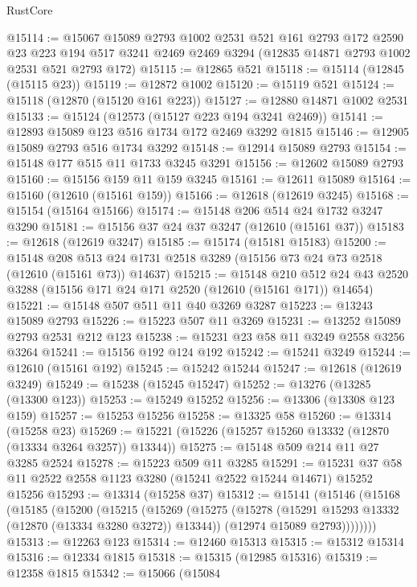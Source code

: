 \begin{lexlean}{RustCore}
\begin{coremodule}
@15114 := @15067
    @15089
    @2793
    @1002
    @2531
    @521
    @161
    @2793
    @172
    @2590
    @23
    @223
    @194
    @517
    @3241
    @2469
    @2469
    @3294
    (@12835 @14871 @2793 @1002 @2531 @521 @2793 @172)
@15115 := @12865 @521
@15118 := @15114 (@12845 (@15115 @23))
@15119 := @12872 @1002
@15120 := @15119 @521
@15124 := @15118 (@12870 (@15120 @161 @223))
@15127 := @12880 @14871 @1002 @2531
@15133 := @15124 (@12573 (@15127 @223 @194 @3241 @2469))
@15141 := @12893 @15089 @123 @516 @1734 @172 @2469 @3292 @1815
@15146 := @12905 @15089 @2793 @516 @1734 @3292
@15148 := @12914 @15089 @2793
@15154 := @15148 @177 @515 @11 @1733 @3245 @3291
@15156 := @12602 @15089 @2793
@15160 := @15156 @159 @11 @159 @3245
@15161 := @12611 @15089
@15164 := @15160 (@12610 (@15161 @159))
@15166 := @12618 (@12619 @3245)
@15168 := @15154 (@15164 @15166)
@15174 := @15148 @206 @514 @24 @1732 @3247 @3290
@15181 := @15156 @37 @24 @37 @3247 (@12610 (@15161 @37))
@15183 := @12618 (@12619 @3247)
@15185 := @15174 (@15181 @15183)
@15200 := @15148
    @208
    @513
    @24
    @1731
    @2518
    @3289
    (@15156 @73 @24 @73 @2518 (@12610 (@15161 @73)) @14637)
@15215 := @15148
    @210
    @512
    @24
    @43
    @2520
    @3288
    (@15156 @171 @24 @171 @2520 (@12610 (@15161 @171)) @14654)
@15221 := @15148 @507 @511 @11 @40 @3269 @3287
@15223 := @13243 @15089 @2793
@15226 := @15223 @507 @11 @3269
@15231 := @13252 @15089 @2793 @2531 @212 @123
@15238 := @15231 @23 @58 @11 @3249 @2558 @3256 @3264
@15241 := @15156 @192 @124 @192
@15242 := @15241 @3249
@15244 := @12610 (@15161 @192)
@15245 := @15242 @15244
@15247 := @12618 (@12619 @3249)
@15249 := @15238 (@15245 @15247)
@15252 := @13276 (@13285 (@13300 @123))
@15253 := @15249 @15252
@15256 := @13306 (@13308 @123 @159)
@15257 := @15253 @15256
@15258 := @13325 @58
@15260 := @13314 (@15258 @23)
@15269 := @15221 (@15226 (@15257 @15260 @13332 (@12870 (@13334 @3264 @3257)) @13344))
@15275 := @15148 @509 @214 @11 @27 @3285 @2524
@15278 := @15223 @509 @11 @3285
@15291 := @15231 @37 @58 @11 @2522 @2558 @1123 @3280 (@15241 @2522 @15244 @14671) @15252 @15256
@15293 := @13314 (@15258 @37)
@15312 := @15141
    (@15146
      (@15168
        (@15185
          (@15200
            (@15215
              (@15269
                (@15275
                  (@15278 (@15291 @15293 @13332 (@12870 (@13334 @3280 @3272)) @13344))
                  (@12974 @15089 @2793))))))))
@15313 := @12263 @123
@15314 := @12460 @15313
@15315 := @15312 @15314
@15316 := @12334 @1815
@15318 := @15315 (@12985 @15316)
@15319 := @12358 @1815
@15342 := @15066
    (@15084

\end{coremodule}
\end{lexlean}
